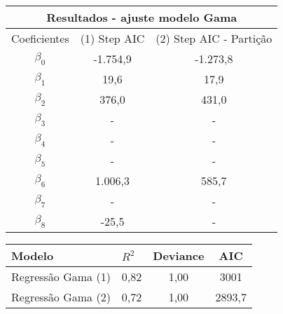 \documentclass{article}
\begin{document}
\begin{table}[]
	\centering
	\begin{tabular}{ccc}
		\hline
		\multicolumn{3}{c}{\textbf{Resultados - ajuste modelo Gama}}               \\ \hline
		\multicolumn{1}{l}{Coeficientes} & (1) Step AIC & (2) Step AIC - Partição \\ \hline
		$\beta_0$                        & -1.754,9    & -1.273,8 \\
		$\beta_1$                        & 19,6        & 17,9     \\
		$\beta_2$                        & 376,0       & 431,0    \\
		$\beta_3$                        & -           & -        \\
		$\beta_4$                        & -           & -        \\
		$\beta_5$                        & -           & -        \\
		$\beta_6$                        & 1.006,3     & 585,7    \\
		$\beta_7$                        & -           & -        \\
		$\beta_8$                        & -25,5       & -        \\ \hline
	\end{tabular}
	\label{tab:my-table}
\end{table}


\begin{table}[]
	\centering
	\begin{tabular}{lccc}
		\hline
		\textbf{Modelo}    & \multicolumn{1}{l}{$R^{2}$} & \textbf{Deviance} & \textbf{AIC}\\ \hline
		Regressão Gama (1) & 0,82                        & 1,00  & 3001             \\
		Regressão Gama (2) & 0,72                        & 1,00  &  2893,7             \\ \hline
	\end{tabular}
\end{table}
\end{document}
